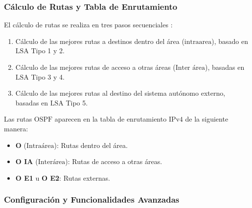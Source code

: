 \documentclass[a5paper]{book}%
\begin{document}
  \subsubsection*{Cálculo de Rutas y Tabla de Enrutamiento}
  
  El cálculo de rutas se realiza en tres pasos secuenciales :
  \begin{enumerate}
  	\item Cálculo de las mejores rutas a destinos dentro del área ($\text{intraarea}$), basado en $\text{LSA}$ Tipo 1 y 2.
  	\item Cálculo de las mejores rutas de acceso a otras áreas ($\text{Inter área}$), basadas en $\text{LSA}$ Tipo 3 y 4.
  	\item Cálculo de las mejores rutas al destino del sistema autónomo externo, basadas en $\text{LSA}$ Tipo 5.
  \end{enumerate}
  
  Las rutas $\text{OSPF}$ aparecen en la tabla de enrutamiento $\text{IPv4}$ de la siguiente manera:
  \begin{itemize}
  	\item \textbf{O} ($\text{Intraárea}$): Rutas dentro del área.
  	\item \textbf{O IA} ($\text{Interárea}$): Rutas de acceso a otras áreas.
  	\item \textbf{O E1} u \textbf{O E2}: Rutas externas.
  \end{itemize}
  
  \subsubsection*{Configuración y Funcionalidades Avanzadas}
  
\end{document}
